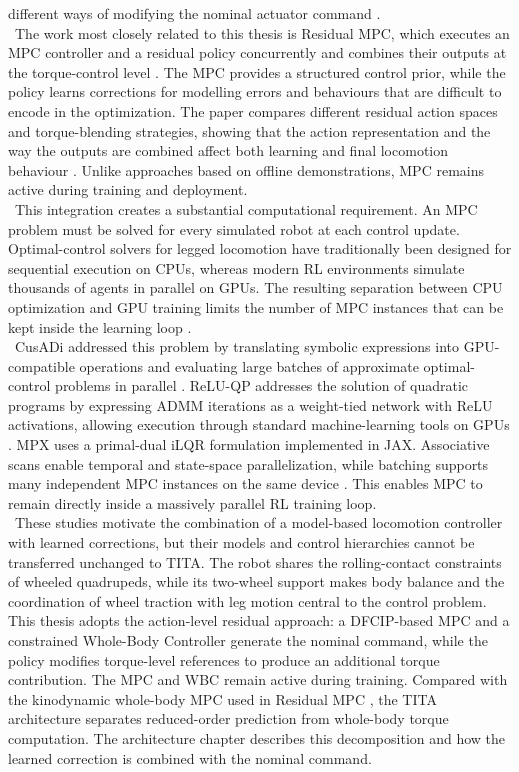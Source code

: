 different ways of modifying the nominal actuator command
\cite{residual_mpc}.\\
\
The work most closely related to this thesis is Residual MPC, which executes an
MPC controller and a residual policy concurrently and combines their outputs at
the torque-control level \cite{residual_mpc}. The MPC provides a structured
control prior, while the policy learns corrections for modelling errors and
behaviours that are difficult to encode in the optimization. The paper compares
different residual action spaces and torque-blending strategies, showing that
the action representation and the way the outputs are combined affect both
learning and final locomotion behaviour \cite{residual_mpc}. Unlike approaches based on
offline demonstrations, MPC
remains active during training and deployment.\\
\
This integration creates a substantial computational requirement. An MPC
problem must be solved for every simulated robot at each control update.
Optimal-control solvers for legged locomotion have traditionally been designed
for sequential execution on CPUs, whereas modern RL environments simulate
thousands of agents in parallel on GPUs. The resulting separation between CPU
optimization and GPU training limits the number of MPC instances that can be
kept inside the learning loop \cite{residual_mpc,mpx}.\\
\
CusADi addressed this problem by translating symbolic expressions into
GPU-compatible operations and evaluating large batches of approximate
optimal-control problems in parallel \cite{cusadi}. ReLU-QP addresses the
solution of quadratic programs by expressing ADMM iterations as a weight-tied
network with ReLU activations, allowing execution through standard
machine-learning tools on GPUs \cite{relu_qp}. MPX uses a primal-dual iLQR formulation
implemented in JAX. Associative scans enable temporal and state-space
parallelization, while batching supports many independent MPC instances on
the same device \cite{mpx}. This enables MPC to remain directly inside a
massively parallel RL training loop.\\
\
These studies motivate the combination of a model-based locomotion controller
with learned corrections, but their models and control hierarchies cannot be
transferred unchanged to TITA. The robot shares the rolling-contact constraints
of wheeled quadrupeds, while its two-wheel support makes body balance and the
coordination of wheel traction with leg motion central to the control problem.
This thesis adopts the action-level residual approach: a DFCIP-based MPC and a
constrained Whole-Body Controller generate the nominal command, while the
policy modifies torque-level references to produce an additional torque
contribution. The MPC and WBC remain active during training. Compared with the
kinodynamic whole-body MPC used in Residual MPC \cite{residual_mpc}, the TITA
architecture separates reduced-order prediction from whole-body torque
computation. The architecture chapter describes this decomposition and how
the learned correction is combined with the nominal command.
